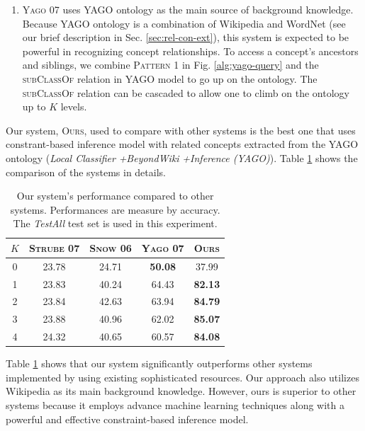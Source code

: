 \begin{enumerate}
\item \textsc{Yago 07} uses YAGO ontology \cite{suchanek2007WWW} as
  the main source of background knowledge. Because YAGO ontology is a
  combination of Wikipedia and WordNet (see our brief description in
  Sec. \ref{sec:rel-con-ext}), this system is expected to be powerful
  in recognizing concept relationships. To access a concept's
  ancestors and siblings, we combine \textsc{Pattern 1} in
  Fig. \ref{alg:yago-query} and the \textsc{subClassOf} relation in
  YAGO model to go up on the ontology. The \textsc{subClassOf}
  relation can be cascaded to allow one to climb on the ontology up to
  $K$ levels.

\end{enumerate}

Our system, \textsc{Ours}, used to compare with other systems is the
best one that uses constrant-based inference model with related
concepts extracted from the YAGO ontology ({\em Local Classifier} {\em
  +BeyondWiki} {\em +Inference (YAGO)}). Table
\ref{table:compare-others} shows the comparison of the systems in
details.

\begin{table}[hp]
  \begin{center}
    \begin{tabular}{|c||c|c|c|c|}
      \hline
      $K$  &  \textsc{Strube 07}  &  \textsc{Snow 06}  &  \textsc{Yago 07}  &  \textsc{Ours}            \\
      \hline
      0  &      23.78  &    24.71  &  \textbf{50.08}  &  37.99           \\
      1  &      23.83  &    40.24  &           64.43  &  \textbf{82.13}  \\
      2  &      23.84  &    42.63  &           63.94  &  \textbf{84.79}  \\
      3  &      23.88  &    40.96  &           62.02  &  \textbf{85.07}  \\
      4  &      24.32  &    40.65  &           60.57  &  \textbf{84.08}  \\
      \hline
    \end{tabular}
    \caption{Our system's performance compared to other
      systems. Performances are measure by accuracy. The {\em TestAll}
      test set is used in this experiment.}
    \label{table:compare-others}
  \end{center}
\end{table}

Table \ref{table:compare-others} shows that our system significantly
outperforms other systems implemented by using existing sophisticated
resources. Our approach also utilizes Wikipedia as its main background
knowledge. However, ours is superior to other systems because it
employs advance machine learning techniques along with a powerful and
effective constraint-based inference model.

